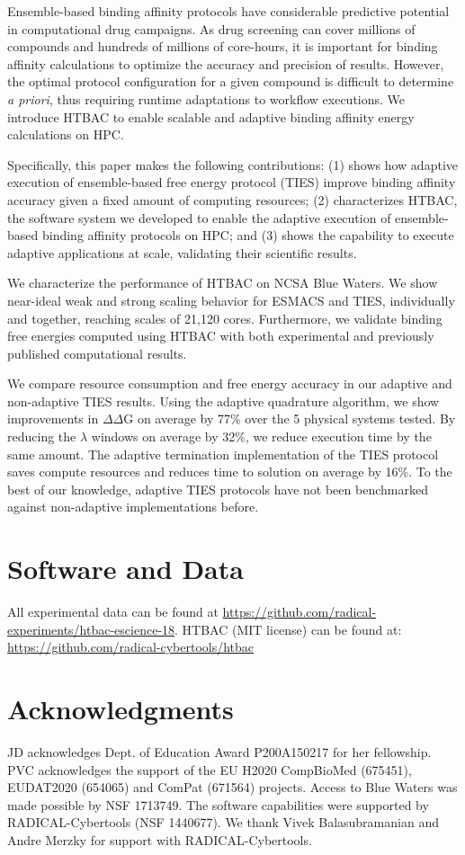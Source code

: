 Ensemble-based binding affinity protocols have considerable predictive
potential in computational drug campaigns. As drug screening can cover
millions of compounds and hundreds of millions of core-hours, it is important
for binding affinity calculations to optimize the accuracy and precision of
results. However, the optimal protocol configuration for a given compound is
difficult to determine \textit{a priori}, thus requiring runtime adaptations
to workflow executions. We introduce HTBAC to enable scalable and adaptive
binding affinity energy calculations on HPC.

Specifically, this paper makes the following contributions: (1) shows how
adaptive execution of ensemble-based free energy protocol (TIES) improve
binding affinity accuracy given a fixed amount of computing resources; (2)
characterizes HTBAC, the software system we developed to enable the adaptive
execution of ensemble-based binding affinity protocols on HPC; and (3) shows
the capability to execute adaptive applications at scale, validating their
scientific results.

We characterize the performance of HTBAC on NCSA Blue Waters. We show
near-ideal weak and strong scaling behavior for ESMACS and TIES, individually
and together, reaching scales of 21,120 cores. Furthermore, we validate
binding free energies computed using HTBAC with both experimental and
previously published computational results.

We compare resource consumption and free energy accuracy in our adaptive and
non-adaptive TIES results. Using the adaptive quadrature algorithm, we show
improvements in $\Delta \Delta$G on average by 77\% over the 5 physical
systems tested. By reducing the $\lambda$ windows on average by 32\%, we
reduce execution time by the same amount. The adaptive termination
implementation of the TIES protocol saves compute resources and reduces time
to solution on average by 16\%. To the best of our knowledge, adaptive TIES
protocols have not been benchmarked against non-adaptive implementations
before.

\section*{Software and Data}

All experimental data can be found at
\url{https://github.com/radical-experiments/htbac-escience-18}. HTBAC (MIT
license) can be found at: \url{https://github.com/radical-cybertools/htbac}

\section*{Acknowledgments}

JD acknowledges Dept. of Education Award P200A150217 for her
fellowship. PVC acknowledges the support of the EU H2020 CompBioMed (675451),
EUDAT2020 (654065) and ComPat (671564) projects. Access to Blue Waters was
made possible by NSF 1713749. The software capabilities were supported by
RADICAL-Cybertools (NSF 1440677). We thank Vivek Balasubramanian and Andre
Merzky for support with RADICAL-Cybertools.
